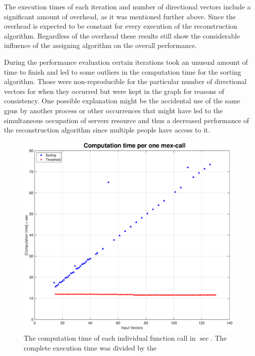 The execution times of each iteration and number of directional vectors include a significant amount of overhead, as it was mentioned further above. Since the overhead is expected to be constant for every execution of the reconstruction algorithm. Regardless of the overhead these results still show the considerable influence of the assigning algorithm on the overall performance.

During the performance evaluation certain iterations took an unusual amount of time to finish and led to some outliers in the computation time for the sorting algorithm. Those were non-reproducible for the particular number of directional vectors for when they occurred but were kept in the graph for reasons of consistency. One possible explanation might be the accidental use of the same  \acp{gpu} by another process or other occurrences that might have led to the simultaneous occupation of servers resource and thus a decreased performance of the reconstruction algorithm since multiple people have access to it.


\begin{figure}[H]
    \centering
    \includegraphics[width=1.08\textwidth]{Graphics/Results/computation_time_per_mexcall.eps}
    \caption{The computation time of each individual function call in $\sec$. The complete execution time was divided by the   }
    \label{fig:computation_per_mex}
\end{figure}

